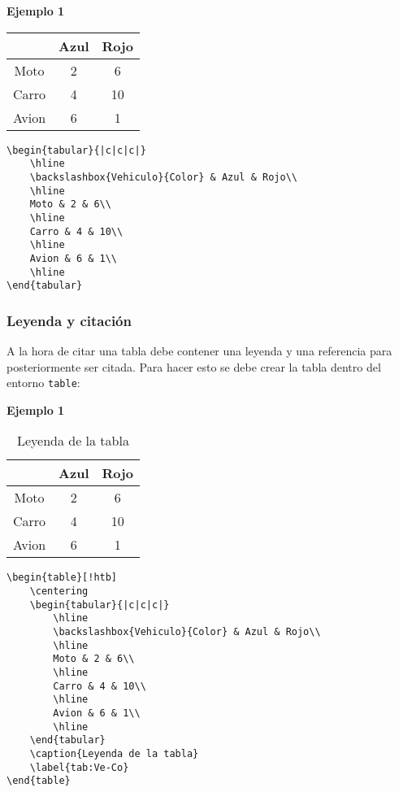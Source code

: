 	\textbf{Ejemplo 1}
	
	\begin{center}
		\begin{tabular}{|c|c|c|}
			\hline 
			\backslashbox{Vehiculo}{Color} & Azul & Rojo\\
			\hline
			Moto & 2 & 6\\
			\hline
			Carro & 4 & 10\\
			\hline
			Avion & 6 & 1\\
			\hline
		\end{tabular}
	\end{center}
	
	\begin{myquote}
		\begin{lstlisting}
\begin{tabular}{|c|c|c|}
	\hline 
	\backslashbox{Vehiculo}{Color} & Azul & Rojo\\
	\hline
	Moto & 2 & 6\\
	\hline
	Carro & 4 & 10\\
	\hline
	Avion & 6 & 1\\
	\hline
\end{tabular}			
		\end{lstlisting}		
	\end{myquote}
	
	\subsubsection{Leyenda y citación}
	
	A la hora de citar una tabla debe contener una leyenda y una referencia para posteriormente ser citada. Para hacer esto se debe crear la tabla dentro del entorno \verb|table|:
	
	\textbf{Ejemplo 1}
	
	\begin{table}[!htb]
		\centering
		\begin{tabular}{|c|c|c|}
			\hline 
			\backslashbox{Vehiculo}{Color} & Azul & Rojo\\
			\hline
			Moto & 2 & 6\\
			\hline
			Carro & 4 & 10\\
			\hline
			Avion & 6 & 1\\
			\hline
		\end{tabular}
		\caption{Leyenda de la tabla}
		\label{tab:Ve-Co}
	\end{table}	
	
	\begin{myquote}
		\begin{lstlisting}
\begin{table}[!htb]
	\centering
	\begin{tabular}{|c|c|c|}
		\hline 
		\backslashbox{Vehiculo}{Color} & Azul & Rojo\\
		\hline
		Moto & 2 & 6\\
		\hline
		Carro & 4 & 10\\
		\hline
		Avion & 6 & 1\\
		\hline
	\end{tabular}
	\caption{Leyenda de la tabla}
	\label{tab:Ve-Co}
\end{table}						
		\end{lstlisting}		
	\end{myquote}
